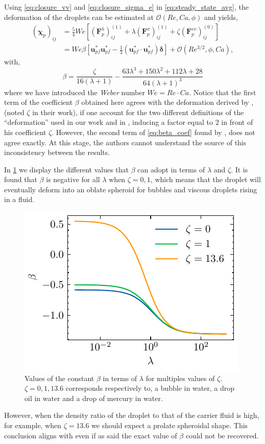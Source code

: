 Using \ref{eq:closure_vv} and \ref{eq:closure_sigma_e} in  \ref{eq:steady_state_avg}, the deformation of the droplets can be estimated at $\mathcal{O}(Re,Ca,\phi)$ and yields, 
\begin{align}
    (\bm\chi_{p})_{ij}
    &= 
    \frac{5}{4}We \left[
        (\textbf{F}_p^h )_{ij}^{(1)}
        + \lambda (\textbf{F}_p^{\sigma})_{ij}^{(1)}
        + \zeta (\textbf{F}_p^{vv})_{ij}^{(0)}
    \right]
    \label{eq:deformation_final1}
    \\
    &= We \beta [\textbf{u}_{pf}^*\textbf{u}_{pf}^* - \frac{1}{3}(\textbf{u}_{pf}^*\cdot \textbf{u}_{pf}^*)\bm\delta ]
    + \mathcal{O}(Re^{3/2},\phi,Ca),
    \label{eq:deformation_final}
\end{align}
with, 
\begin{equation}
    \beta = 
    \frac{\zeta}{16 \left(\lambda + 1\right)} 
    - \frac{63 \lambda^{3} + 150 \lambda^{2} + 112 \lambda + 28}{64 \left(\lambda + 1\right)^{3}}
    \label{eq:beta_coef}
\end{equation}
where we have introduced the \textit{Weber} number $We = Re \cdot Ca$. 
Notice that the first term of the coefficient $\beta$ obtained here agrees with the deformation derived by \citet{taylor1964deformation}, (noted $\zeta$ in their work), if one account for the two different definitions of the ``deformation'' used in our work and in \citet{taylor1964deformation}, inducing a factor equal to $2$ in front of his coefficient $\zeta$.
However, the second term of \ref{eq:beta_coef} found by \citet{taylor1964deformation}, does not agree exactly.
At this stage, the authors cannot understand the source of this inconsistency between the results.

In \ref{fig:beta} we display the different values that $\beta$ can adopt in terms of $\lambda$ and $\zeta$. 
It is found that $\beta$ is negative for all $\lambda$ when  $\zeta = 0, 1$, which means that the droplet will eventually deform into an oblate spheroid for bubbles and viscous droplets rising in a fluid. 
\begin{figure}[h!]
    \centering
    \includegraphics[height=0.25\textwidth]{image/Theory/beta.pdf}
    \caption{Values of the constant $\beta$ in terms of $\lambda$ for multiples values of $\zeta$. 
    $\zeta = 0,1,13.6$ corresponds respectively to, a bubble in water, a drop oil in water and a drop of mercury in water. }
    \label{fig:beta}
\end{figure}
However, when the density ratio of the droplet to that of the carrier fluid is high, for example, when $\zeta = 13.6$ we should expect a prolate spheroidal shape. 
This conclusion aligns with \citet{taylor1964deformation} even if as said the exact value of $\beta$ could not be recovered. 

